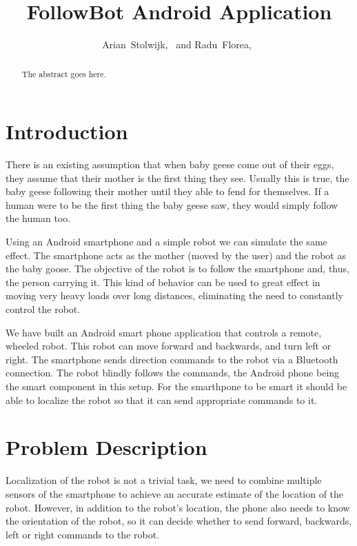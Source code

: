 \documentclass[journal]{IEEEtran}
\begin{document}
\title{FollowBot Android Application}


\author{Arian~Stolwijk,~
        and Radu~Florea,~}%

%
{}
\maketitle

\begin{abstract}
The abstract goes here.
\end{abstract}

\section{Introduction}

There is an existing assumption that when baby geese come out of their eggs,
they assume that their mother is the first thing they see. Usually this is
true, the baby geese following their mother until they able to fend for
themselves. If a human were to be the first thing the baby geese saw, they
would simply follow the human too.

Using an Android smartphone and a simple robot we can simulate the same effect.
The smartphone acts as the mother (moved by the user) and the robot as the baby
goose. The objective of the robot is to follow the smartphone and, thus, the
person carrying it. This kind of behavior can be used to great effect in moving
very heavy loads over long distances, eliminating the need to constantly
control the robot.

We have built an Android smart phone application that controls a remote,
wheeled robot. This robot can move forward and backwards, and turn left or
right. The smartphone sends direction commands to the robot via a Bluetooth
connection.  The robot blindly follows the commands, the Android phone being
the smart component in this setup. For the smarthpone to be smart it should be
able to localize the robot so that it can send appropriate commands to it.

\section{Problem Description}

Localization of the robot is not a trivial task, we need to combine multiple
sensors of the smartphone to achieve an accurate estimate of the location of
the robot. However, in addition to the robot's location, the phone also needs
to know the orientation of the robot, so it can decide whether to send forward,
backwards, left or right commands to the robot.
\end{document}
